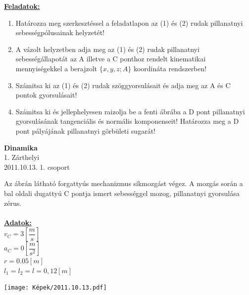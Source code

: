 \documentclass[11pt,a4paper]{article}
\begin{document}
\vspace{2em}
\underline{\textbf{Feladatok:}}
\begin{enumerate}
    \item Határozza meg szerkesztéssel a feladatlapon az (1) és (2) rudak pillanatnyi
    sebességpólusainak helyzetét!
    \item A vázolt helyzetben adja meg az (1) és (2) rudak pillanatnyi sebességállapotát az A illetve a C ponthoz rendelt kinematikai mennyiségekkel a berajzolt \(\{x,y,z; A\}\) koordináta rendszerben!
    \item Számitsa ki az (1) és (2) rudak szöggyorsulásait és adja meg az A és C pontok
    gyorsulásait!
    \item Számitsa ki és jellephelyesen raizolja be a fenti ábrába a D pont pillanatnyi gyorsulásának tangenciális és normális komponenseit! Határozza meg a D pont pályájának pillanatnyi görbületi sugarát!
\end{enumerate}
\newpage

\begin{center}
    \textbf{\LARGE{Dinamika}}\\
    1. Zárthelyi\\
    2011.10.13. 1. csoport
\end{center}
Az ábrán látható forgattyús mechanizmus síkmozgást végez. A mozgás során a bal oldali dugattyú
C pontja ismert sebességgel mozog, pillanatnyi gyorsulása zérus.\\\\
\underline{\textbf{Adatok:}}\\
$v_C = 3 \left[\dfrac{m}{s}\right]$\\
$a_C = 0 \left[\dfrac{m}{s^2}\right]$\\
$r = 0.05 [m]$\\
$l_1 = l_2=l = 0,12 [m]$\\
\begin{center}
    \texttt{[image: Képek/2011.10.13.pdf]}
\end{center}
\end{document}
